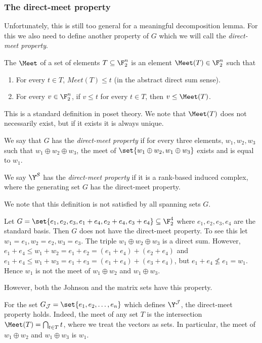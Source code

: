 \subsubsection{The direct-meet property}
Unfortunately, this is still too general for a meaningful decomposition lemma. For this we also need to define another property of \(G\) which we will call the \emph{direct-meet property}.

\begin{definition}[Meet]
    The \(\Meet\) of a set of elements \(T \subseteq \F_2^n\) is an element \(\Meet(T) \in \F_2^n\) such that \begin{enumerate}
        \item For every \(t \in T\), \(Meet(T) \leq t\) (in the abstract direct sum sense). 
        \item For every \(v \in \F_2^n\), if \(v \leq t\) for every \(t \in T\), then \(v \leq \Meet(T)\).  
    \end{enumerate}
\end{definition}
This is a standard definition in poset theory. We note that \(\Meet(T)\) does not necessarily exist, but if it exists it is always unique.

\begin{definition}
    We say that \(G\) has the \emph{direct-meet property} if for every three elements, \(w_1,w_2,w_3\) such that \(w_1 \oplus w_2 \oplus w_3\), the meet of \(\set{w_1 \oplus w_2,w_1 \oplus w_3}\) exists and is equal to \(w_1\).
\end{definition}
We say \(\Y^{\mathcal{S}}\) has the \emph{direct-meet property} if it is a rank-based induced complex, where the generating set \(G\) has the direct-meet property.

We note that this definition is not satisfied by all spanning sets \(G\).
\begin{example}
    Let \(G=\set{e_1,e_2,e_3,e_1+e_4,e_2+e_4,e_3+e_4} \subseteq \F_2^4\) where \(e_1,e_2,e_3,e_4\) are the standard basis. Then \(G\) does not have the direct-meet property. To see this let \(w_1=e_1,w_2=e_2,w_3=e_3\). The triple \(w_1 \oplus w_2 \oplus w_3\) is a direct sum. However, \(e_1+e_4 \leq w_1+w_2=e_1+e_2=(e_1+e_4)+(e_2+e_4)\) and \(e_1+e_4 \leq w_1+w_3=e_1+e_3=(e_1+e_4)+(e_3+e_4)\), but \(e_1+e_4 \not \leq e_1 = w_1\). Hence \(w_1\) is not the meet of \(w_1 \oplus w_2\) and \(w_1 \oplus w_3\).
\end{example}

However, both the Johnson and the matrix sets have this property.
\begin{example}
For the set \(G_{\mathcal{J}}=\set{e_1,e_2,\dots,e_n}\) which defines \(\Y^{\mathcal{J}}\), the direct-meet property holds. Indeed, the meet of any set \(T\) is the intersection \(\Meet(T) = \bigcap_{t \in T}t\), where we treat the vectors as sets. In particular, the meet of \(w_1 \oplus w_2\) and \(w_1 \oplus w_3\) is \(w_1\).    
\end{example}

